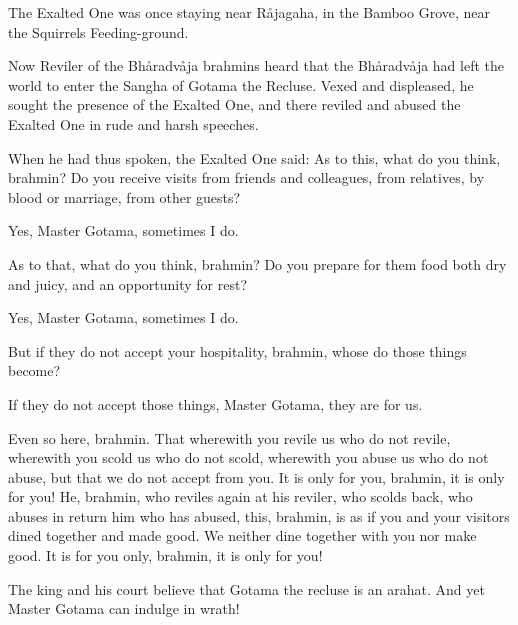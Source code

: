 \documentclass[12pt,twoside]{article}
\begin{document}
\bigskip

The Exalted One was once staying near R{\aa}jagaha, in the Bamboo Grove,
near the Squirrels{\textquotesingle} Feeding{}-ground. 

Now
{\textasciigrave}{\textasciigrave}Reviler{\textquotesingle}{\textquotesingle}
of the Bh{\aa}radv{\aa}ja brahmins heard that the Bh{\aa}radv{\aa}ja
had left the world to enter the Sangha of Gotama the Recluse. Vexed and
displeased, he sought the presence of the Exalted One, and there
reviled and abused the Exalted One in rude and harsh speeches. 

When he had thus spoken, the Exalted One said:
{\textasciigrave}{\textasciigrave}As to this, what do you think,
brahmin? Do you receive visits from friends and colleagues, from
relatives, by blood or marriage, from other
guests?{\textquotesingle}{\textquotesingle}

{\textasciigrave}{\textasciigrave}Yes, Master Gotama, sometimes I
do.{\textquotesingle}{\textquotesingle}

{\textasciigrave}{\textasciigrave}As to that, what do you think,
brahmin? Do you prepare for them food both dry and juicy, and an
opportunity for rest?{\textquotesingle}{\textquotesingle}

{\textasciigrave}{\textasciigrave}Yes, Master Gotama, sometimes I do.
{\textquotesingle}{\textquotesingle}

{\textasciigrave}{\textasciigrave}But if they do not accept your
hospitality, brahmin, whose do those things
become?{\textquotesingle}{\textquotesingle}

{\textasciigrave}{\textasciigrave}If they do not accept those things,
Master Gotama, they are for us.{\textquotesingle}{\textquotesingle} 

Even so here, brahmin. That wherewith you revile us who do not revile,
wherewith you scold us who do not scold, wherewith you abuse us who do
not abuse, but that we do not accept from you. It is only for you,
brahmin, it is only for you! He, brahmin, who reviles again at his
reviler, who scolds back, who abuses in return him who has abused,
this, brahmin, is as if you and your visitors dined together and made
good. We neither dine together with you nor make good. It is for you
only, brahmin, it is only for you!{\textquotesingle}{\textquotesingle}

{\textasciigrave}{\textasciigrave}The king and his court believe that
Gotama the recluse is an arahat. And yet Master Gotama can indulge in
wrath!{\textquotesingle}{\textquotesingle}
\end{document}
